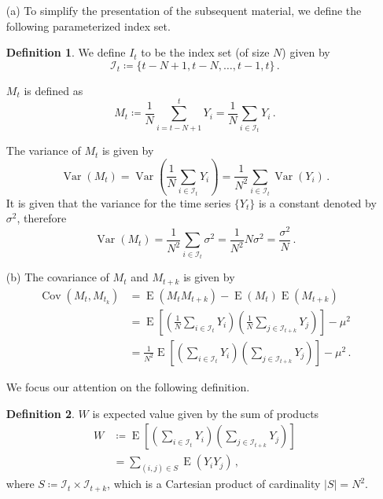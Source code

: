 \documentclass[10pt]{fphw}
\theoremstyle{definition}
\newtheorem{definition}{Definition}
\newcommand{\var}{\operatorname{Var}}
\newcommand{\expect}{\operatorname{E}}
\newcommand{\cov}{\operatorname{Cov}}
\newcommand{\is}[1]{\mathcal{I}_{#1}}
\begin{document}
\begin{enumerate}
\item[(a)] To simplify the presentation of the subsequent material, we define the following parameterized index set.

\begin{definition}
We define $I_t$ to be the index set (of size $N$) given by
\begin{equation}
    \mathcal{I}_t \coloneqq \{ t-N+1,t-N,\ldots,t-1,t \}\,.
\end{equation}
\end{definition}

$M_t$ is defined as
\begin{equation}
    M_t \coloneqq \frac{1}{N} \!\!\sum_{i=t-N+1}^{t}\!\!\!\! Y_i = \frac{1}{N}\sum_{i \in \is{t}} Y_i\,.
\end{equation}

The variance of $M_t$ is given by
\begin{equation}
    \var(M_t) = \var\!\left(\frac{1}{N} \sum_{i \in \is{t}} Y_i\right) = \frac{1}{N^2} \sum_{i \in \is{t}} \var(Y_i)\,.
\end{equation}
It is given that the variance for the time series $\{Y_t\}$ is a constant denoted by $\sigma^2$, therefore
\begin{equation}
    \var(M_t) = \frac{1}{N^2} \sum_{i \in \is{t}} \sigma^2 = \frac{1}{N^2} N \sigma^2 = \frac{\sigma^2}{N}\,.
\end{equation}

\item[(b)] The covariance of $M_t$ and $M_{t+k}$ is given by
\begin{align}
    \cov(M_t,M_{t_k}) &= \expect(M_t M_{t+k}) - \expect(M_t)\expect(M_{t+k})\\
                      &= \expect\left[\left(\frac{1}{N} \sum_{i\in\is{t}} Y_i\right) \left(\frac{1}{N} \sum_{j\in\is{t+k}} Y_j\right)\right] - \mu^2\\
                      &= \frac{1}{N^2}\expect\left[\left(\sum_{i \in \is{t}} Y_i\right) \left(\sum_{j\in\is{t+k}} Y_j\right)\right] - \mu^2\,.
\end{align}

We focus our attention on the following definition.

\begin{definition}
$W$ is expected value given by the sum of products
\begin{align}
    W &\coloneqq \expect\left[\left(\sum_{i\in\is{t}} Y_i\right) \left(\sum_{j\in\is{t+k}} Y_j\right)\right]\\
      &= \sum_{(i,j) \in S} \expect(Y_i Y_j)\,,
\end{align}
where $S \coloneqq \is{t} \times \is{t+k}$, which is a Cartesian product of cardinality $|S| = N^2$.
\end{definition}


\end{enumerate}
\end{document}
